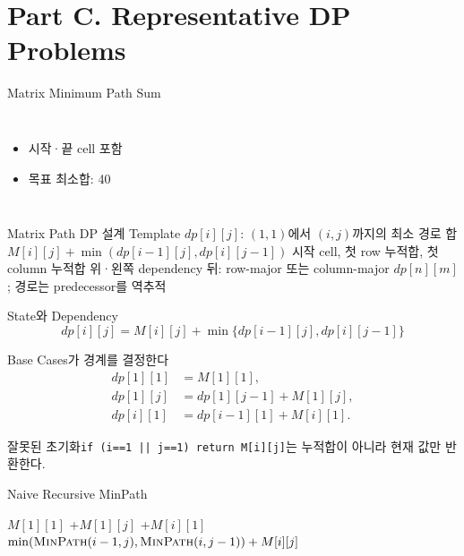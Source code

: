\section{Part C. Representative DP Problems}
\begin{frame}{Matrix Minimum Path Sum}
\begin{columns}\centering\matrixfour{}
\begin{itemize}\item 시작·끝 cell 포함\item 목표 최소합: 40\end{itemize}
\end{columns}
\end{frame}
\begin{frame}{Matrix Path DP 설계 Template}
\small
\dpdesign
{$dp[i][j]$: $(1,1)$에서 $(i,j)$까지의 최소 경로 합}
{$M[i][j]+\min(dp[i-1][j],dp[i][j-1])$}
{시작 cell, 첫 row 누적합, 첫 column 누적합}
{위·왼쪽 dependency 뒤: row-major 또는 column-major}
{$dp[n][m]$; 경로는 predecessor를 역추적}
\end{frame}
\begin{frame}{State와 Dependency}
\[
dp[i][j]=M[i][j]+\min\{dp[i-1][j],dp[i][j-1]\}
\]
\centering{}
\end{frame}
\begin{frame}{Base Cases가 경계를 결정한다}
\[
\begin{aligned}
dp[1][1]&=M[1][1],\\
dp[1][j]&=dp[1][j-1]+M[1][j],\\
dp[i][1]&=dp[i-1][1]+M[i][1].
\end{aligned}
\]
\begin{alertblock}{잘못된 초기화}\texttt{if (i==1 || j==1) return M[i][j]}는 누적합이 아니라 현재 값만 반환한다.\end{alertblock}
\end{frame}
\begin{frame}{Naive Recursive MinPath}
\algofont\begin{algorithmic}[1]
\State\Return $M[1][1]$\EndIf
{}\State\Return {}+$M[1][j]$\EndIf
{}\State\Return {}+$M[i][1]$\EndIf
\State\Return $\min(\Call{MinPath}{i-1,j},\Call{MinPath}{i,j-1})+M[i][j]$
\EndProcedure
\end{algorithmic}
\end{frame}
